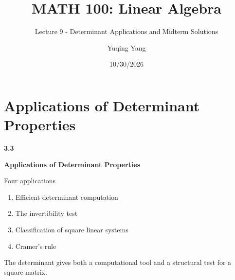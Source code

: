 \documentclass[aspectratio=169]{beamer}
\title{MATH 100: Linear Algebra}
\subtitle{Lecture 9 - Determinant Applications and Midterm Solutions}
\author{Yuqing Yang}
\institute{Macau University of Science and Technology}
\date{10/30/2026}
\newcommand{\sectioncard}[2]{%
  \begin{frame}[plain]
    \vfill\centering
    {\Huge\color{lectureorange}\bfseries #1}\par\bigskip
    {\LARGE\color{lecturegreen}\bfseries #2}
    \vfill
  \end{frame}}
\begin{document}
\begin{frame}[plain]
  \titlepage
\end{frame}



\section[Determinant Applications]{Applications of Determinant Properties}
\sectioncard{3.3}{Applications of Determinant Properties}

\begin{frame}{Four applications}
\begin{enumerate}
  \item Efficient determinant computation
  \item The invertibility test
  \item Classification of square linear systems
  \item Cramer's rule
\end{enumerate}
\medskip
The determinant gives both a computational tool and a structural test for a square matrix.
\end{frame}
\end{document}
